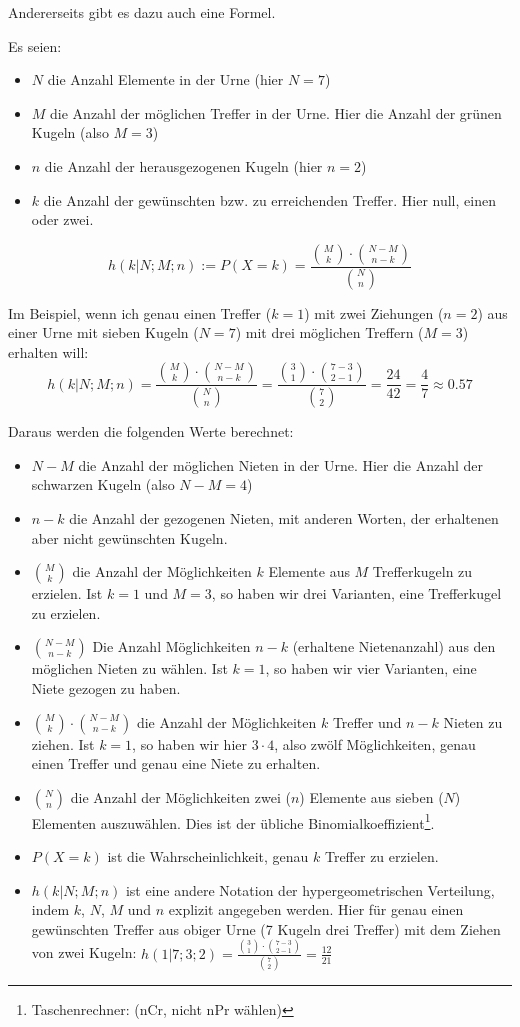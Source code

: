 Andererseits gibt es dazu auch eine Formel.

Es seien:
\begin{itemize}
\item $N$ die Anzahl Elemente in der Urne (hier $N = 7$)
\item $M$ die Anzahl der möglichen Treffer in der Urne. Hier die Anzahl der grünen Kugeln (also $M = 3$)
\item $n$ die Anzahl der herausgezogenen Kugeln (hier $n = 2$)
\item $k$ die Anzahl der gewünschten bzw. zu erreichenden Treffer. Hier \zB null, einen oder zwei.
\end{itemize}
\begin{gesetz}{}{}
$$h(k|N;M;n) := P(X=k) = \frac{ {M\choose k} \cdot{} {{N-M}\choose {n-k}}}{{N \choose n}}$$
\end{gesetz}

Im Beispiel, wenn ich genau einen Treffer ($k=1$) mit zwei Ziehungen ($n=2$) aus einer Urne mit sieben Kugeln ($N=7$) mit drei möglichen Treffern ($M=3$) erhalten will:
$$h(k|N;M;n) = \frac{ {M\choose k} \cdot{} {{N-M}\choose {n-k}}}{{N \choose n}} = \frac{ {3\choose 1} \cdot{} {{7-3}\choose {2-1}}}{{7 \choose 2}} = \frac{24}{42} = \frac47 \approx 0.57$$
\newpage


Daraus werden die folgenden Werte berechnet:

\begin{itemize}
\item $N-M$ die Anzahl der möglichen Nieten in der Urne. Hier die Anzahl der schwarzen Kugeln (also $N-M = 4$)
\item $n-k$ die Anzahl der gezogenen Nieten, mit anderen Worten, der erhaltenen aber nicht gewünschten Kugeln.
\item $M\choose k$ die Anzahl der Möglichkeiten $k$ Elemente aus $M$ Trefferkugeln zu erzielen. Ist \zB $k=1$ und $M=3$, so haben wir drei Varianten, eine Trefferkugel zu erzielen.
\item ${N-M}\choose {n-k}$ Die Anzahl Möglichkeiten $n-k$ (erhaltene Nietenanzahl) aus den möglichen Nieten zu wählen. Ist \zB $k=1$, so haben wir vier Varianten, eine Niete gezogen zu haben.
\item ${M\choose k} \cdot{} {{N-M}\choose {n-k}}$ die Anzahl der Möglichkeiten $k$ Treffer und $n-k$ Nieten zu ziehen. Ist \zB $k=1$, so haben wir hier $3\cdot{}4$, also zwölf Möglichkeiten, genau einen Treffer und genau eine Niete zu erhalten.
\item $N \choose n$ die Anzahl der Möglichkeiten zwei ($n$) Elemente
  aus sieben ($N$) Elementen auszuwählen. Dies ist der übliche
  Binomialkoeffizient\footnote{Taschenrechner:  (nCr, nicht nPr wählen)}.
\item $P(X=k)$ ist die Wahrscheinlichkeit, genau $k$ Treffer zu erzielen.
\item $h(k|N;M;n)$ ist eine andere Notation der hypergeometrischen Verteilung, indem $k$, $N$, $M$ und $n$ explizit angegeben werden. Hier \zB für genau einen gewünschten Treffer aus obiger Urne (7 Kugeln drei Treffer) mit dem Ziehen von zwei Kugeln: $h(1|7;3;2)=\frac{{3 \choose 1} \cdot{} {{7-3}\choose {2-1}  }   }{{ 7 \choose 2 }}=\frac{12}{21}$
\end{itemize}

